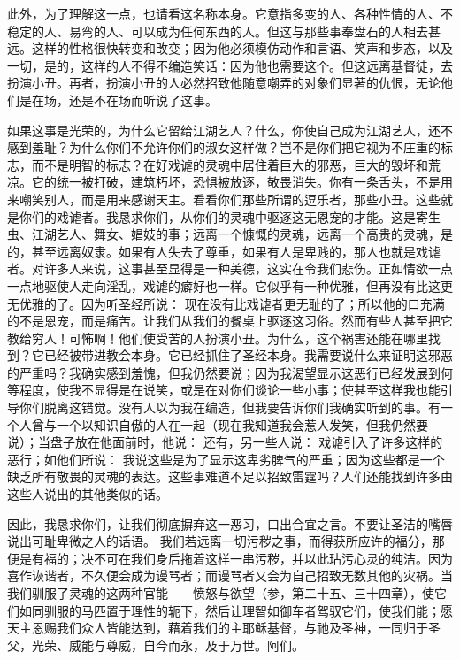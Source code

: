 此外，为了理解这一点，也请看这名称本身。它意指多变的人、各种性情的人、不稳定的人、易弯的人、可以成为任何东西的人。但这与那些事奉盘石的人相去甚远。这样的性格很快转变和改变；因为他必须模仿动作和言语、笑声和步态，以及一切，是的，这样的人不得不编造笑话：因为他也需要这个。但这远离基督徒，去扮演小丑。再者，扮演小丑的人必然招致他随意嘲弄的对象们显著的仇恨，无论他们是在场，还是不在场而听说了这事。\par

如果这事是光荣的，为什么它留给江湖艺人？什么，你使自己成为江湖艺人，还不感到羞耻？为什么你们不允许你们的淑女这样做？岂不是你们把它视为不庄重的标志，而不是明智的标志？在好戏谑的灵魂中居住着巨大的邪恶，巨大的毁坏和荒凉。它的统一被打破，建筑朽坏，恐惧被放逐，敬畏消失。你有一条舌头，不是用来嘲笑别人，而是用来感谢天主。看看你们那些所谓的逗乐者，那些小丑。这些就是你们的戏谑者。我恳求你们，从你们的灵魂中驱逐这无恩宠的才能。这是寄生虫、江湖艺人、舞女、娼妓的事；远离一个慷慨的灵魂，远离一个高贵的灵魂，是的，甚至远离奴隶。如果有人失去了尊重，如果有人是卑贱的，那人也就是戏谑者。对许多人来说，这事甚至显得是一种美德，这实在令我们悲伤。正如情欲一点一点地驱使人走向淫乱，戏谑的癖好也一样。它似乎有一种优雅，但再没有比这更无优雅的了。因为听圣经所说： 现在没有比戏谑者更无耻的了；所以他的口充满的不是恩宠，而是痛苦。让我们从我们的餐桌上驱逐这习俗。然而有些人甚至把它教给穷人！可怖啊！他们使受苦的人扮演小丑。为什么，这个祸害还能在哪里找到？它已经被带进教会本身。它已经抓住了圣经本身。我需要说什么来证明这邪恶的严重吗？我确实感到羞愧，但我仍然要说；因为我渴望显示这恶行已经发展到何等程度，使我不显得是在说笑，或是在对你们谈论一些小事；使甚至这样我也能引导你们脱离这错觉。没有人以为我在编造，但我要告诉你们我确实听到的事。有一个人曾与一个以知识自傲的人在一起（现在我知道我会惹人发笑，但我仍然要说）；当盘子放在他面前时，他说： 还有，另一些人说： 戏谑引入了许多这样的恶行；如他们所说： 我说这些是为了显示这卑劣脾气的严重；因为这些都是一个缺乏所有敬畏的灵魂的表达。这些事难道不足以招致雷霆吗？人们还能找到许多由这些人说出的其他类似的话。\par

因此，我恳求你们，让我们彻底摒弃这一恶习，口出合宜之言。不要让圣洁的嘴唇说出可耻卑微之人的话语。  我们若远离一切污秽之事，而得获所应许的福分，那便是有福的；决不可在我们身后拖着这样一串污秽，并以此玷污心灵的纯洁。因为喜作诙谐者，不久便会成为谩骂者；而谩骂者又会为自己招致无数其他的灾祸。当我们驯服了灵魂的这两种官能——愤怒与欲望（参，第二十五、三十四章），使它们如同驯服的马匹置于理性的轭下，然后让理智如御车者驾驭它们，使我们能；愿天主恩赐我们众人皆能达到，藉着我们的主耶稣基督，与祂及圣神，一同归于圣父，光荣、威能与尊威，自今而永，及于万世。阿们。\par

